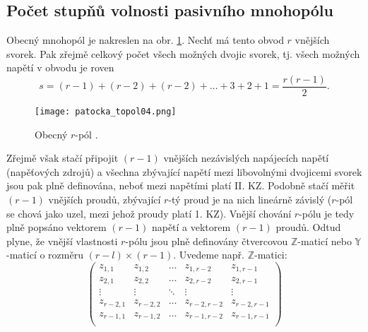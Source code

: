     \subsection{Počet stupňů volnosti pasivního mnohopólu}\label{teo:IchapIIIsecIsubIV}
      Obecný mnohopól je nakreslen na obr. \ref{es:fig_patocka_topol04}. Nechť má tento obvod \(r\) 
      vnějších svorek. Pak zřejmě celkový počet všech možných dvojic svorek, tj. všech možných 
      napětí v obvodu je roven
      \begin{equation}\label{ES:eq_topol07}
        s=(r-1) + (r-2) + (r-2) + \ldots + 3 + 2 + 1 = \frac{r(r-1)}{2}.
      \end{equation}
      \begin{figure}[ht!]   %
        \centering
        \texttt{[image: patocka\_topol04.png]}
        \caption{Obecný \(r\)-pól \cite[s.~46]{Patocka4}.}
        \label{es:fig_patocka_topol04}
      \end{figure}
      Zřejmě však stačí připojit \((r-1)\) vnějších nezávislých napájecích napětí (napěťových 
      zdrojů) a všechna zbývající napětí mezi libovolnými dvojicemi svorek jsou pak plně 
      definována, neboť mezi napětími platí II. KZ. Podobně stačí měřit \((r-1)\) vnějších proudů, 
      zbývající \(r\)-tý proud je na nich lineárně závislý (\(r\)-pól se chová jako uzel, mezi 
      jehož proudy platí 1. KZ). Vnější chování \(r\)-pólu je tedy plně popsáno vektorem \((r-1)\) 
      napětí a vektorem \((r-1)\) proudů. Odtud plyne, že vnější vlastnosti \(r\)-pólu jsou plně 
      definovány čtvercovou \(\mathbb{Z}\)-maticí nebo \(\mathbb{Y}\)-maticí o rozměru 
      \((r-l)\times(r-1)\). Uvedeme např. \(\mathbb{Z}\)-matici:  
      \begin{equation}\label{ES:eq_topol08}
        \left(
          \begin{array}{ccccc}
            z_{1,1}    &  z_{1,2}   & \ldots & z_{1,r-2}   & z_{1,r-1}    \\
            z_{2,1}    &  z_{2,2}   & \ldots & z_{2,r-2}   & z_{2,r-1}    \\
            \vdots     &  \vdots    & \ddots & \vdots      &\vdots        \\
            z_{r-2,1}  &  z_{r-2,2} & \ldots & z_{r-2,r-2} & z_{r-2,r-1}  \\
            z_{r-1,1}  &  z_{r-1,2} & \ldots & z_{r-1,r-2} & z_{r-1,r-1}  \\
          \end{array}
        \right)
      \end{equation}
      
